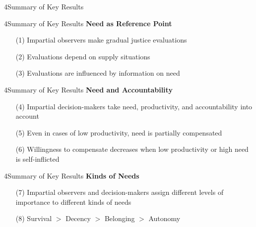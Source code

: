\documentclass[xcolor=table,9pt,aspectratio=169]{beamer}
\begin{document}
\begin{frame}
\begin{overlayarea}{\textwidth}{0.81\paperheight}{
   \vspace*{11mm}
   \textcolor{uolblue}
   {4\hspace*{1em}Summary of Key Results}
}
\end{overlayarea}
\end{frame}


\begin{frame}{\vspace*{10mm}4\hspace*{1em}Summary of Key Results}
\textbf{Need as Reference Point}
\medskip
\begin{itemize}
   \item[(1)] Impartial observers make gradual justice evaluations
   \item[(2)] Evaluations depend on supply situations
   \item[(3)] Evaluations are influenced by information on need
\end{itemize}
\end{frame}


\begin{frame}{\vspace*{10mm}4\hspace*{1em}Summary of Key Results}
\textbf{Need and Accountability}\\
\medskip
\begin{itemize}
   \item[(4)] Impartial decision-makers take need, productivity, and accountability into account
   \item[(5)] Even in cases of low productivity, need is partially compensated
   \item[(6)] Willingness to compensate decreases when low productivity or high need is self-inflicted
\end{itemize}
\end{frame}


\begin{frame}{\vspace*{10mm}4\hspace*{1em}Summary of Key Results}
\textbf{Kinds of Needs}\\
\medskip
\begin{itemize}
   \item[(7)] Impartial observers and decision-makers assign different levels of importance to different kinds of needs
   \item[(8)] Survival $>$ Decency $>$ Belonging $>$ Autonomy
\end{itemize}
\end{frame}
\end{document}
